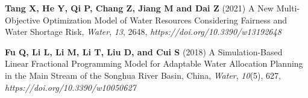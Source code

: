 \documentclass[ruler]{CUP-JNL-EDS}%
\begin{document}
\begin{Backmatter}
\begin{thebibliography}{}
\textbf{Tang X, He Y, Qi P, Chang Z, Jiang M and Dai Z} (2021) A New Multi-Objective Optimization Model of Water Resources Considering Fairness and Water Shortage Risk, \textit{Water}, \textit{13}, 2648, \textit{https://doi.org/10.3390/w13192648}

\textbf{Fu Q, Li L, Li M, Li T, Liu D, and Cui S} (2018) A Simulation-Based Linear Fractional Programming Model for Adaptable Water Allocation Planning in the Main Stream of the Songhua River Basin, China, \textit{Water}, \textit{10}(5), 627, \textit{https://doi.org/10.3390/w10050627}

\end{thebibliography}
\end{Backmatter}
\end{document}
